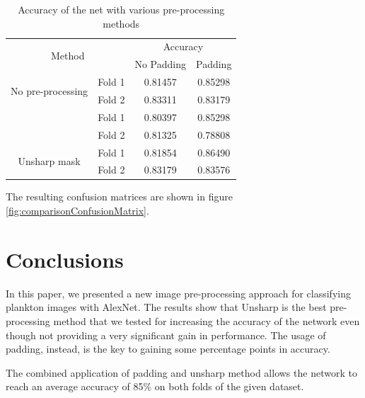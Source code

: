 \documentclass[letterpaper]{article} %
\begin{document}
\begin{table}[H]
    \centering
    \begin{tabular}{|c c|c c|}
        \hline
        \multicolumn{2}{|c|}{\multirow{2}{*}{Method}} & \multicolumn{2}{c|}{Accuracy} \\
                                                & & No Padding & Padding \\
        \hline
        \multirow{2}{*}{No pre-processing}   & Fold 1    & 0.81457 & 0.85298 \\
                                            & Fold 2    & 0.83311 & 0.83179 \\
        \hline
        \multirow{2}{*}{\citealt{hybridPreprocessingDai2017}}      & Fold 1    & 0.80397 & 0.85298 \\
                                            & Fold 2    & 0.81325 & 0.78808 \\
        \hline
        \multirow{2}{*}{Unsharp mask}      & Fold 1    & 0.81854 & 0.86490 \\
                                            & Fold 2    & 0.83179 & 0.83576 \\
        \hline
    \end{tabular}
    \caption{Accuracy of the net with various pre-processing methods}
    \label{tab:accuracy}
\end{table}

The resulting confusion matrices are shown in figure \ref{fig:comparisonConfusionMatrix}.


\section{Conclusions} \label{sec:conclusions}
In this paper, we presented a new image pre-processing approach for classifying plankton images with AlexNet.
The results show that Unsharp is the best pre-processing method that we tested for increasing the accuracy of the network even though not providing a very significant gain in performance.
The usage of padding, instead, is the key to gaining some percentage points in accuracy.

The combined application of padding and unsharp method allows the network to reach an average accuracy of 85\% on both folds of the given dataset.



\newpage
\onecolumn
\end{document}
